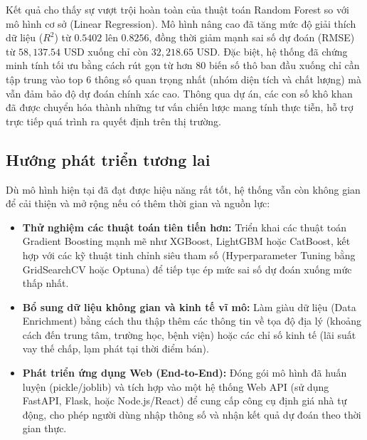 Kết quả cho thấy sự vượt trội hoàn toàn của thuật toán Random Forest so với mô hình cơ sở (Linear Regression). Mô hình nâng cao đã tăng mức độ giải thích dữ liệu ($R^2$) từ $0.5402$ lên $0.8256$, đồng thời giảm mạnh sai số dự đoán (RMSE) từ $58,137.54$ USD xuống chỉ còn $32,218.65$ USD. Đặc biệt, hệ thống đã chứng minh tính tối ưu bằng cách rút gọn từ hơn 80 biến số thô ban đầu xuống chỉ cần tập trung vào top 6 thông số quan trọng nhất (nhóm diện tích và chất lượng) mà vẫn đảm bảo độ dự đoán chính xác cao. Thông qua dự án, các con số khô khan đã được chuyển hóa thành những tư vấn chiến lược mang tính thực tiễn, hỗ trợ trực tiếp quá trình ra quyết định trên thị trường.

\subsection{Hướng phát triển tương lai}
Dù mô hình hiện tại đã đạt được hiệu năng rất tốt, hệ thống vẫn còn không gian để cải thiện và mở rộng nếu có thêm thời gian và nguồn lực:

\begin{itemize}
    \item[-] \textbf{Thử nghiệm các thuật toán tiên tiến hơn:} Triển khai các thuật toán Gradient Boosting mạnh mẽ như XGBoost, LightGBM hoặc CatBoost, kết hợp với các kỹ thuật tinh chỉnh siêu tham số (Hyperparameter Tuning bằng GridSearchCV hoặc Optuna) để tiếp tục ép mức sai số dự đoán xuống mức thấp nhất.
    
    \item[-] \textbf{Bổ sung dữ liệu không gian và kinh tế vĩ mô:} Làm giàu dữ liệu (Data Enrichment) bằng cách thu thập thêm các thông tin về tọa độ địa lý (khoảng cách đến trung tâm, trường học, bệnh viện) hoặc các chỉ số kinh tế (lãi suất vay thế chấp, lạm phát tại thời điểm bán).
    
    \item[-] \textbf{Phát triển ứng dụng Web (End-to-End):} Đóng gói mô hình đã huấn luyện (pickle/joblib) và tích hợp vào một hệ thống Web API (sử dụng FastAPI, Flask, hoặc Node.js/React) để cung cấp công cụ định giá nhà tự động, cho phép người dùng nhập thông số và nhận kết quả dự đoán theo thời gian thực.
\end{itemize}